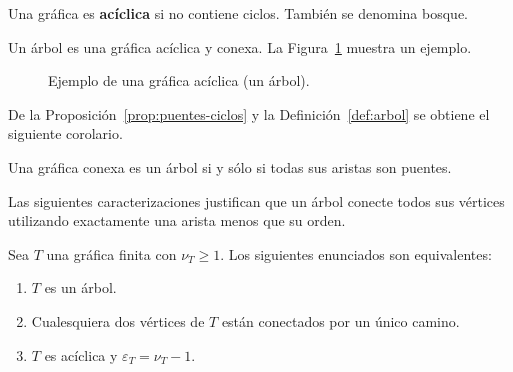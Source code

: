  \begin{definition}
 \label{def:grafica-aciclica}
     Una gráfica es \textbf{acíclica} si no contiene ciclos. También se denomina bosque.
 \end{definition}


 \begin{definition}[Árbol]
 \label{def:arbol}
  Un árbol es una gráfica acíclica y conexa. La Figura~\ref{fig:aciclica} muestra un ejemplo.
 \end{definition}
\begin{figure}[H]
    \centering
    \caption{Ejemplo de una gráfica acíclica (un árbol).}
    \label{fig:aciclica}
\end{figure}

 
De la Proposición~\ref{prop:puentes-ciclos} y la Definición~\ref{def:arbol} se obtiene el siguiente corolario.

\begin{corollary}
\label{cor:arbol-puentes}
Una gráfica conexa es un árbol si y sólo si todas sus aristas son puentes.
\end{corollary}

Las siguientes caracterizaciones justifican que un árbol conecte todos sus vértices utilizando exactamente una arista menos que su orden.
\begin{teorema}
\label{teo:caracterizaciones-arbol}
Sea $T$ una gráfica finita con $\nu_T\geq1$. Los siguientes enunciados son equivalentes:
\begin{enumerate}
    \item $T$ es un árbol.
    \item Cualesquiera dos vértices de $T$ están conectados por un único camino.
    \item $T$ es acíclica y $\varepsilon_T=\nu_T-1$.
\end{enumerate}
\end{teorema}

